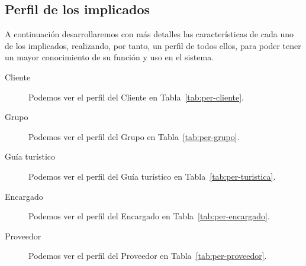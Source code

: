 \subsection{Perfil de los implicados}
A continuación desarrollaremos con más detalles las características de cada uno de los implicados, realizando, por tanto, un perfil de todos ellos, para poder tener un mayor conocimiento de su función y uso en el sistema.
\begin{description}
    \item[Cliente] Podemos ver el perfil del Cliente en Tabla~\ref{tab:per-cliente}.
    \item[Grupo] Podemos ver el perfil del Grupo en Tabla~\ref{tab:per-grupo}.
    \item[Guía turístico] Podemos ver el perfil del Guía turístico en Tabla~\ref{tab:per-turistica}.
    \item[Encargado] Podemos ver el perfil del Encargado en Tabla~\ref{tab:per-encargado}.
    \item[Proveedor] Podemos ver el perfil del Proveedor en Tabla~\ref{tab:per-proveedor}.
\end{description}




